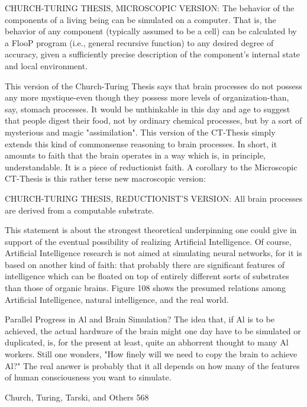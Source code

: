 {   CHURCH-TURING THESIS, MICROSCOPIC VERSION: The behavior of the
     components of a living being can be simulated on a computer. That is, the
     behavior of any component (typically assumed to be a cell) can be calculated by
     a FlooP program (i.e., general recursive function) to any desired degree of
     accuracy, given a sufficiently precise description of the component's internal
     state and local environment.

This version of the Church-Turing Thesis says that brain processes do not possess any
more mystique-even though they possess more levels of organization-than, say, stomach
processes. It would be unthinkable in this day and age to suggest that people digest their
food, not by ordinary chemical processes, but by a sort of mysterious and magic
"assimilation". This version of the CT-Thesis simply extends this kind of commonsense
reasoning to brain processes. In short, it amounts to faith that the brain operates in a way
which is, in principle, understandable. It is a piece of reductionist faith.
       A corollary to the Microscopic CT-Thesis is this rather terse new macroscopic
version:

CHURCH-TURING THESIS, REDUCTIONIST'S VERSION: All brain processes are
  derived from a computable substrate.

This statement is about the strongest theoretical underpinning one could give in support
of the eventual possibility of realizing Artificial Intelligence.
        Of course, Artificial Intelligence research is not aimed at simulating neural
networks, for it is based on another kind of faith: that probably there are significant
features of intelligence which can be floated on top of entirely different sorts of substrates
than those of organic brains. Figure 108 shows the presumed relations among Artificial
Intelligence, natural intelligence, and the real world.

                 Parallel Progress in Al and Brain Simulation?
The idea that, if Al is to be achieved, the actual hardware of the brain might one day have
to be simulated or duplicated, is, for the present at least, quite an abhorrent thought to
many Al workers. Still one wonders, "How finely will we need to copy the brain to
achieve Al?" The real answer is probably that it all depends on how many of the features
of human consciousness you want to simulate.




Church, Turing, Tarski, and Others                                                        568

}
